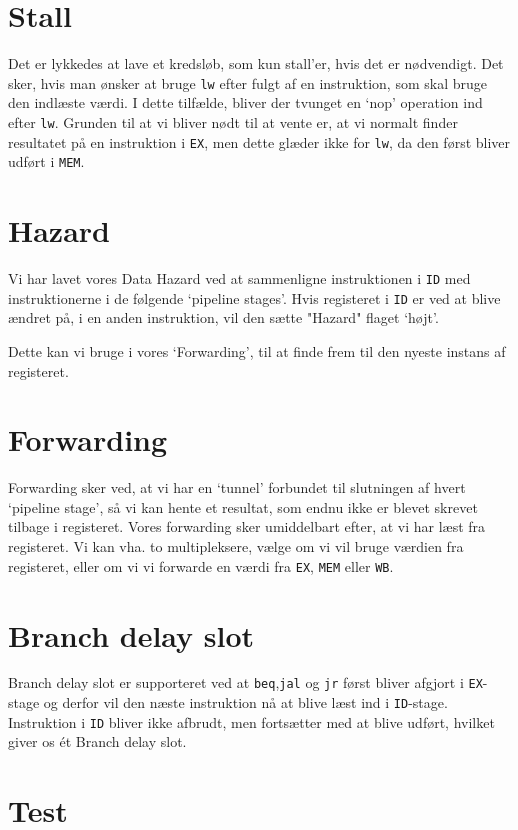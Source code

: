 \documentclass[12pt, a4paper]{article}
\begin{document}
\section{Stall}
Det er lykkedes at lave et kredsløb, som kun stall'er, hvis det er nødvendigt. Det sker, hvis man ønsker at bruge \texttt{lw} efter fulgt af en instruktion, som skal bruge den indlæste værdi. I dette tilfælde, bliver der tvunget en `nop' operation ind efter \texttt{lw}. Grunden til at vi bliver nødt til at vente er, at vi normalt finder resultatet på en instruktion i \texttt{EX}, men dette glæder ikke for \texttt{lw}, da den først bliver udført i \texttt{MEM}.

\section{Hazard}

Vi har lavet vores Data Hazard ved at sammenligne instruktionen i \texttt{ID} med instruktionerne i de følgende `pipeline stages'. Hvis registeret i \texttt{ID} er ved at blive ændret på, i en anden instruktion, vil den sætte "Hazard" flaget `højt'.

Dette kan vi bruge i vores `Forwarding', til at finde frem til den nyeste instans af registeret.


\section{Forwarding}

Forwarding sker ved, at vi har en `tunnel' forbundet til slutningen af hvert `pipeline stage', så vi kan hente et resultat, som endnu ikke er blevet skrevet tilbage i registeret. Vores forwarding sker umiddelbart efter, at vi har læst fra registeret. Vi kan vha. to multipleksere, vælge om vi vil bruge værdien fra registeret, eller om vi vi forwarde en værdi fra \texttt{EX}, \texttt{MEM} eller \texttt{WB}.


\section{Branch delay slot}
Branch delay slot er supporteret ved at \texttt{beq},\texttt{jal} og \texttt{jr} først bliver afgjort i \texttt{EX}-stage og derfor vil den næste instruktion nå at blive læst ind i \texttt{ID}-stage. Instruktion i \texttt{ID} bliver ikke afbrudt, men fortsætter med at blive udført, hvilket giver os ét Branch delay slot.


\section{Test}
\end{document}
